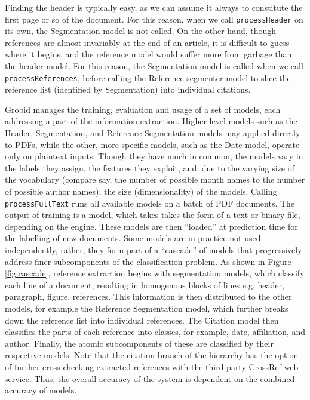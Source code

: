 \documentclass[11pt, oneside]{scrartcl}   	%
\begin{document}
Finding the header is typically easy, as we can assume it always to constitute the first page or so of the document. For this reason, when we call \texttt{processHeader} on its own, the Segmentation model is not called. On the other hand, though references are almost invariably at the end of an article, it is difficult to guess where it begins, and the reference model would suffer more from garbage than the header model. For this reason, the Segmentation model is called when we call \texttt{processReferences}, before calling the Reference-segmenter model to slice the reference list (identified by Segmentation) into individual citations.

Grobid manages the training, evaluation and usage of a set of models, each addressing a part of the information extraction. Higher level models such as the Header, Segmentation, and Reference Segmentation models may applied directly to PDFs, while the other, more specific models, such as the Date model, operate only on plaintext inputs. Though they have much in common, the models vary in the labels they assign, the features they exploit, and, due to the varying size of the vocabulary (compare say, the number of possible month names to the number of possible author names), the size (dimensionality) of the models. Calling \texttt{processFullText} runs all available models on a batch of PDF documents. The output of training is a model, which takes takes the form of a text or binary file, depending on the engine. These models are then ``loaded'' at prediction time for the labelling of new documents. Some models are in practice not used independently, rather, they form part of a ``cascade'' of models that progressively address finer subcomponents of the classification problem. As shown in Figure \ref{fig:cascade}, reference extraction begins with segmentation models, which classify each line of a document, resulting in homogenous blocks of lines e.g. header, paragraph, figure, references. This information is then distributed to the other models, for example the Reference Segmentation model, which further breaks down the reference list into individual references. The Citation model then classifies the parts of each reference into classes, for example, date, affiliation, and author. Finally, the atomic subcomponents of these are classified by their respective models. Note that the citation branch of the hierarchy has the option of further cross-checking extracted references with the third-party CrossRef web service. Thus, the overall accuracy of the system is dependent on the combined accuracy of models.
\end{document}
